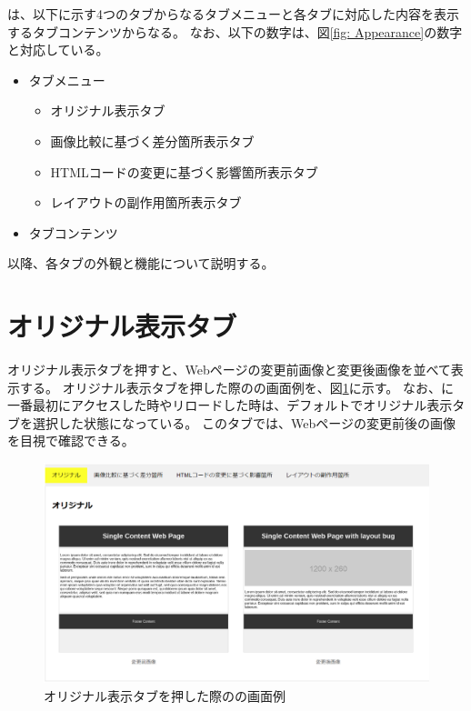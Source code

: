 \toolName は、以下に示す4つのタブからなるタブメニューと各タブに対応した内容を表示するタブコンテンツからなる。
なお、以下の数字は、図\ref{fig: Appearance}の数字と対応している。
\begin{itemize}
    \item[①] タブメニュー
          \begin{itemize}
              \item オリジナル表示タブ
              \item 画像比較に基づく差分箇所表示タブ
              \item HTMLコードの変更に基づく影響箇所表示タブ
              \item レイアウトの副作用箇所表示タブ
          \end{itemize}
    \item[②] タブコンテンツ
\end{itemize}
\par
以降、各タブの外観と機能について説明する。



\section{オリジナル表示タブ}\label{sec:original_tab}
オリジナル表示タブを押すと、Webページの変更前画像と変更後画像を並べて表示する。
オリジナル表示タブを押した際の\toolName の画面例を、図\ref{fig: Appearance_original_tab}に示す。
なお、\toolName に一番最初にアクセスした時やリロードした時は、デフォルトでオリジナル表示タブを選択した状態になっている。
このタブでは、Webページの変更前後の画像を目視で確認できる。
\begin{figure}[tp]
    \begin{center}
        \includegraphics[width=1.0\columnwidth]{image/3_original_tab.png}
        \caption{オリジナル表示タブを押した際の\toolName の画面例}
        \label{fig: Appearance_original_tab}
    \end{center}
\end{figure}



